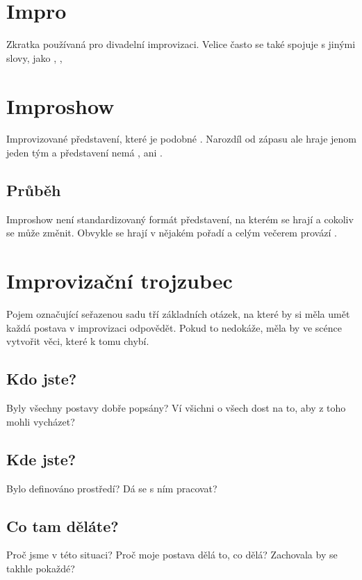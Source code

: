  
\needspace{5cm} \section{Impro} \label{impro} Zkratka používaná pro divadelní improvizaci. Velice často se také spojuje s jinými slovy, jako , ,  
 
 
\needspace{5cm} \section{Improshow} \label{improshow} Improvizované představení, které je podobné . Narozdíl od zápasu ale hraje jenom jeden tým a představení nemá , ani . 
 
\subsection{ Průběh } Improshow není standardizovaný formát představení, na kterém se hrají  a cokoliv se může změnit. Obvykle se hrají  v nějakém pořadí a celým večerem provází . 
 
 
 
 
 
\needspace{5cm} \section{Improvizační trojzubec} \label{improvizační trojzubec} Pojem označující seřazenou sadu tří základních otázek, na které by si měla umět každá postava v improvizaci odpovědět. Pokud to nedokáže, měla by ve scénce vytvořit věci, které k tomu chybí. 
 
\subsection{ Kdo jste? } Byly všechny postavy dobře popsány? Ví všichni o všech dost na to, aby z toho mohli vycházet? 
 
\subsection{ Kde jste? } Bylo definováno prostředí? Dá se s ním pracovat? 
 
\subsection{ Co tam děláte? } Proč jsme v této situaci? Proč moje postava dělá to, co dělá? Zachovala by se takhle pokaždé? 
 
